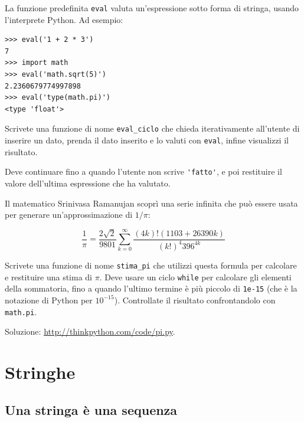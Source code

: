 \documentclass[10pt]{book}
\begin{document}
\vspace{0.2in}
\begin{exercise}

La funzione predefinita {\tt eval} valuta un'espressione sotto forma di stringa, usando l'interprete Python. Ad esempio:

\begin{verbatim}
>>> eval('1 + 2 * 3')
7
>>> import math
>>> eval('math.sqrt(5)')
2.2360679774997898
>>> eval('type(math.pi)')
<type 'float'>
\end{verbatim}
%
Scrivete una funzione di nome \verb"eval_ciclo" che chieda iterativamente all'utente di inserire un dato, prenda il dato inserito e lo valuti con {\tt eval}, infine visualizzi il risultato.

Deve continuare fino a quando l'utente non scrive \verb"'fatto'", e poi restituire il valore dell'ultima espressione che ha valutato.

\end{exercise}

\vspace{0.2in}
\begin{exercise}

Il matematico Srinivasa Ramanujan scoprì una serie infinita che può essere usata per generare un'approssimazione di $1 / \pi$:

\[ \frac{1}{\pi} = \frac{2\sqrt{2}}{9801} 
\sum^\infty_{k=0} \frac{(4k)!(1103+26390k)}{(k!)^4 396^{4k}} \]

Scrivete una funzione di nome \verb"stima_pi" che utilizzi questa formula per calcolare e restituire una stima di $\pi$.  Deve usare un ciclo {\tt while}
per calcolare gli elementi della sommatoria, fino a quando l'ultimo termine è più piccolo di {\tt 1e-15} (che è la notazione di Python per $10^{-15}$).
Controllate il risultato confrontandolo con {\tt math.pi}.

Soluzione: \url{http://thinkpython.com/code/pi.py}.

\end{exercise}


\chapter{Stringhe}
\label{strings}


\section{Una stringa è una sequenza}
\end{document}
